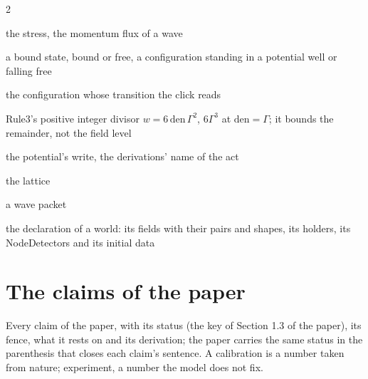 \documentclass[pdflatex,sn-mathphys-num]{sn-jnl}
\newcommand{\den}{\mathrm{den}}
\theoremstyle{thmstyleone}
\begin{document}
\begin{multicols}{2}
\begin{description}[style=unboxed,leftmargin=0pt,itemsep=0pt,parsep=0pt,font=\normalfont\itshape]
\item[tension] the stress, the momentum flux of a wave
\item[body] a bound state, bound or free, a configuration standing in a potential well or falling free
\item[the taker] the configuration whose transition the click reads
\item[the wall] Rule3's positive integer divisor $w = 6\,\den\,\Gamma^2$, $6\Gamma^3$ at $\den = \Gamma$; it bounds the remainder, not the field level
\item[the hold] the potential's write, the derivations' name of the act
\item[the event lattice] the lattice
\item[packet] a wave packet
\item[the declared universe] the declaration of a world: its fields with their pairs and shapes, its holders, its NodeDetectors and its initial data
\end{description}\end{multicols}

\section*{The claims of the paper}

\noindent Every claim of the paper, with its status (the key of Section 1.3 of the paper), its fence, what it rests on and its derivation; the paper carries the same status in the parenthesis that closes each claim's sentence. A calibration is a number taken from nature; experiment, a number the model does not fix.
\end{document}
